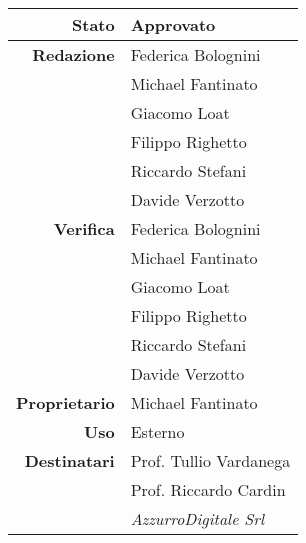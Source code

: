 \thispagestyle{empty} %

\begin{center}
\begin{tabular}{r|l}
    \textbf{Stato} & Approvato \\
    \hline
    \textbf{Redazione} & Federica Bolognini \\
                       & Michael Fantinato \\
                       & Giacomo Loat \\
                       & Filippo Righetto \\
                       & Riccardo Stefani \\
                       & Davide Verzotto \\
    \hline
    \textbf{Verifica} & Federica Bolognini \\
                      & Michael Fantinato \\
                      & Giacomo Loat \\
                      & Filippo Righetto \\
                      & Riccardo Stefani \\
                      & Davide Verzotto \\
    \hline
    \textbf{Proprietario} & Michael Fantinato \\
    \hline
    \textbf{Uso} & Esterno \\
    \hline
    \textbf{Destinatari} & Prof. Tullio Vardanega \\
                         & Prof. Riccardo Cardin \\
                         & \emph{AzzurroDigitale Srl} \\
\end{tabular}
\end{center}
    
